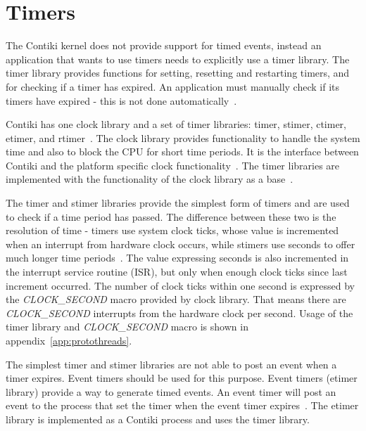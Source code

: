 
\section{Timers}\label{sec:contiki-timers}
The Contiki kernel does not provide support for timed events,
instead an application that wants to use timers needs to explicitly use a timer library.
The timer library provides functions for setting, resetting and restarting timers,
and for checking if a timer has expired.
An application must manually check if its timers have expired - this is not done automatically~\cite{contiki-docs}.

Contiki has one clock library and a set of timer libraries: timer, stimer, ctimer, etimer, and rtimer~\cite{contiki-wiki-timers}.
The clock library provides functionality to handle the system time and also to block the CPU for short time periods.
It is the interface between Contiki and the platform specific clock functionality~\cite{contiki-docs}.
The timer libraries are implemented with the functionality of the clock library as a base~\cite{contiki-wiki-timers}.

The timer and stimer libraries provide the simplest form of timers and are used to check if a time period has passed.
The difference between these two is the resolution of time -
timers use system clock ticks, whose value is incremented when an interrupt from hardware clock occurs,
while stimers use seconds to offer much longer time periods~\cite{contiki-wiki-timers}.
The value expressing seconds is also incremented in the interrupt service routine (ISR),
but only when enough clock ticks since last increment occurred.
The number of clock ticks within one second is expressed by the
{\it{CLOCK\_SECOND}} macro provided by clock library.
That means there are {\it{CLOCK\_SECOND}} interrupts from the hardware clock per second.
Usage of the timer library and {\it{CLOCK\_SECOND}} macro is shown in appendix~\ref{app:protothreads}.

The simplest timer and stimer libraries are not able to post an event when a timer expires.
Event timers should be used for this purpose.
Event timers (etimer library) provide a way to generate timed events.
An event timer will post an event to the process that set the timer when the
event timer expires~\cite{contiki-docs}.
The etimer library is implemented as a Contiki process and uses the timer library.

